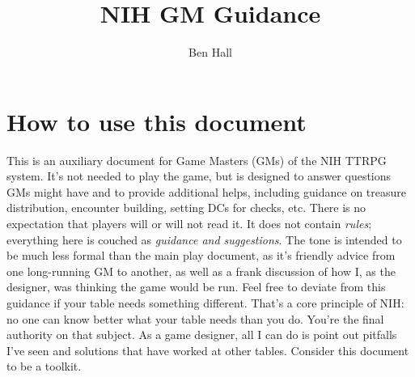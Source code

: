 \documentclass[10pt,twoside,openany,bg=none]{dndbook}
\title{NIH GM Guidance}
\author{Ben Hall}
\date{}
\begin{document}
\maketitle
\section{How to use this document}
This is an auxiliary document for Game Masters (GMs) of the NIH TTRPG system. It's not needed to play the game, but is designed to answer questions GMs might have and to provide additional helps, including guidance on treasure distribution, encounter building, setting DCs for checks, etc. There is no expectation that players will or will not read it. It does not contain \textit{rules}; everything here is couched as \textit{guidance and suggestions}. The tone is intended to be much less formal than the main play document, as it's friendly advice from one long-running GM to another, as well as a frank discussion of how I, as the designer, was thinking the game would be run. Feel free to deviate from this guidance if your table needs something different. That's a core principle of NIH: no one can know better what your table needs than you do. You're the final authority on that subject. As a game designer, all I can do is point out pitfalls I've seen and solutions that have worked at other tables. Consider this document to be a toolkit.
\end{document}
